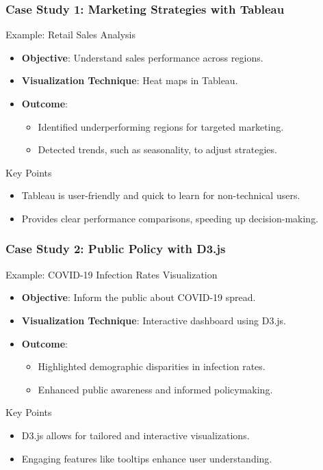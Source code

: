 \documentclass{beamer}
\begin{document}
\begin{frame}[fragile]
    \frametitle{Case Study 1: Marketing Strategies with Tableau}
    \begin{block}{Example: Retail Sales Analysis}
        \begin{itemize}
            \item \textbf{Objective}: Understand sales performance across regions.
            \item \textbf{Visualization Technique}: Heat maps in Tableau.
            \item \textbf{Outcome}:
            \begin{itemize}
                \item Identified underperforming regions for targeted marketing.
                \item Detected trends, such as seasonality, to adjust strategies.
            \end{itemize}
        \end{itemize}
    \end{block}
    \begin{block}{Key Points}
        \begin{itemize}
            \item Tableau is user-friendly and quick to learn for non-technical users.
            \item Provides clear performance comparisons, speeding up decision-making.
        \end{itemize}
    \end{block}
\end{frame}

\begin{frame}[fragile]
    \frametitle{Case Study 2: Public Policy with D3.js}
    \begin{block}{Example: COVID-19 Infection Rates Visualization}
        \begin{itemize}
            \item \textbf{Objective}: Inform the public about COVID-19 spread.
            \item \textbf{Visualization Technique}: Interactive dashboard using D3.js.
            \item \textbf{Outcome}:
            \begin{itemize}
                \item Highlighted demographic disparities in infection rates.
                \item Enhanced public awareness and informed policymaking.
            \end{itemize}
        \end{itemize}
    \end{block}
    \begin{block}{Key Points}
        \begin{itemize}
            \item D3.js allows for tailored and interactive visualizations.
            \item Engaging features like tooltips enhance user understanding.
        \end{itemize}
    \end{block}
\end{frame}
\end{document}
